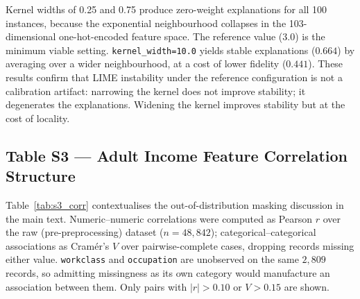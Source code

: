 \documentclass[10pt]{article}
\begin{document}
\noindent Kernel widths of 0.25 and 0.75 produce zero-weight explanations for
all 100 instances, because the exponential neighbourhood collapses in the
103-dimensional one-hot-encoded feature space. The reference value (3.0) is the
minimum viable setting. \texttt{kernel\_width=10.0} yields stable explanations
($0.664$) by averaging over a wider neighbourhood, at a cost of lower fidelity
($0.441$). These results confirm that LIME instability under the reference
configuration is not a calibration artifact: narrowing the kernel does not
improve stability; it degenerates the explanations. Widening the kernel
improves stability but at the cost of locality.

\subsection*{Table S3 — Adult Income Feature Correlation Structure}
\label{sec:supp_corr}

Table~\ref{tab:s3_corr} contextualises the out-of-distribution masking
discussion in the main text. Numeric--numeric correlations were computed as
Pearson $r$ over the raw (pre-preprocessing) dataset ($n = 48{,}842$);
categorical--categorical associations as Cramér's $V$ over pairwise-complete
cases, dropping records missing either value. \texttt{workclass} and
\texttt{occupation} are unobserved on the same $2{,}809$ records, so admitting
missingness as its own category would manufacture an association between them.
Only pairs with $|r| > 0.10$ or $V > 0.15$ are shown.
\end{document}
